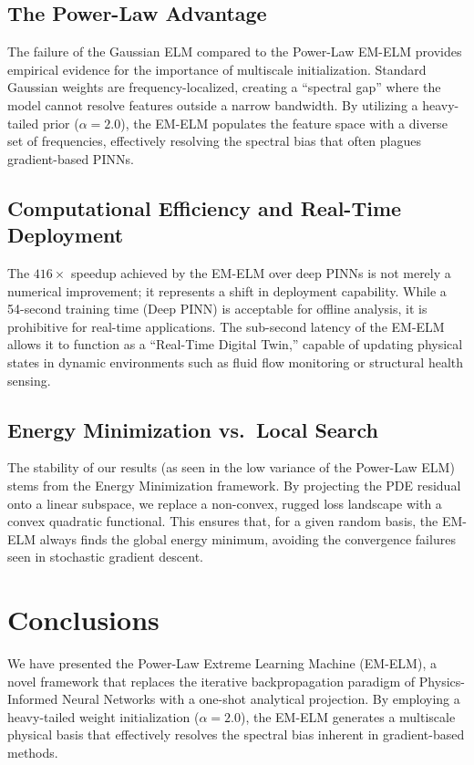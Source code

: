 \documentclass[final,12pt,3p,times,fleqn]{elsarticle}
\begin{document}
\subsection{The Power-Law Advantage}

The failure of the Gaussian ELM compared to the Power-Law EM-ELM provides empirical evidence for the importance of multiscale initialization. Standard Gaussian weights are frequency-localized, creating a ``spectral gap'' where the model cannot resolve features outside a narrow bandwidth. By utilizing a heavy-tailed prior ($\alpha=2.0$), the EM-ELM populates the feature space with a diverse set of frequencies, effectively resolving the spectral bias that often plagues gradient-based PINNs.

\subsection{Computational Efficiency and Real-Time Deployment}

The $416\times$ speedup  achieved by the EM-ELM over deep PINNs is not merely a numerical improvement; it represents a shift in deployment capability. While a 54-second training time (Deep PINN) is acceptable for offline analysis, it is prohibitive for real-time applications. The sub-second latency of the EM-ELM allows it to function as a ``Real-Time Digital Twin,'' capable of updating physical states in dynamic environments such as fluid flow monitoring or structural health sensing.

\subsection{Energy Minimization vs.\ Local Search}

The stability of our results (as seen in the low variance of the Power-Law ELM) stems from the Energy Minimization framework. By projecting the PDE residual onto a linear subspace, we replace a non-convex, rugged loss landscape with a convex quadratic functional. This ensures that, for a given random basis, the EM-ELM always finds the global energy minimum, avoiding the convergence failures seen in stochastic gradient descent.

\section{Conclusions}

We have presented the Power-Law Extreme Learning Machine (EM-ELM), a novel framework that replaces the iterative backpropagation paradigm of Physics-Informed Neural Networks with a one-shot analytical projection. By employing a heavy-tailed weight initialization ($\alpha=2.0$), the EM-ELM generates a multiscale physical basis that effectively resolves the spectral bias inherent in gradient-based methods.
\end{document}
